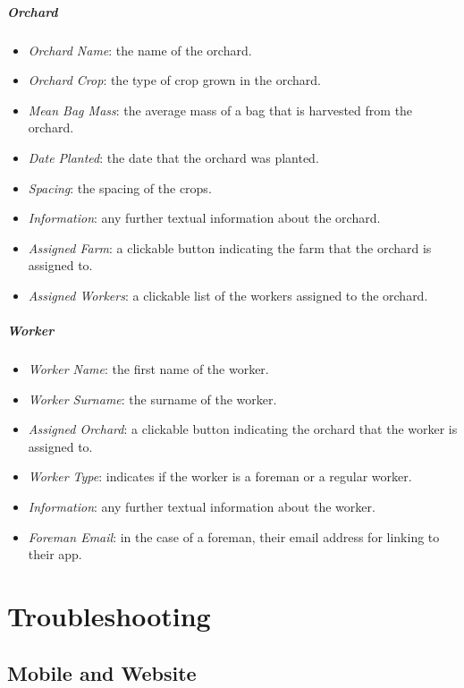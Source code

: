 \documentclass[11pt]{article}
\begin{document}
\subparagraph{Orchard}
\begin{itemize}
 \item \textit{Orchard Name}: the name of the orchard.
\item \textit{Orchard Crop}: the type of crop grown in the orchard.
\item \textit{Mean Bag Mass}: the average mass of a bag that is harvested from the orchard.
\item \textit{Date Planted}: the date that the orchard was planted.
\item \textit{Spacing}: the spacing of the crops.
\item \textit{Information}: any further textual information about the orchard.
\item \textit{Assigned Farm}: a clickable button indicating the farm that the orchard is assigned to.
\item \textit{Assigned Workers}: a clickable list of the workers assigned to the orchard.
\end{itemize}

\subparagraph{Worker}
\begin{itemize}
\item \textit{Worker Name}: the first name of the worker.
\item \textit{Worker Surname}: the surname of the worker.
\item \textit{Assigned Orchard}: a clickable button indicating the orchard that the worker is assigned to.
\item \textit{Worker Type}: indicates if the worker is a foreman or a regular worker.
\item \textit{Information}: any further textual information about the worker.
\item \textit{Foreman Email}: in the case of a foreman, their email address for linking to their app.
\end{itemize}

\newpage
\section{Troubleshooting}

\subsection{Mobile and Website}
\end{document}
